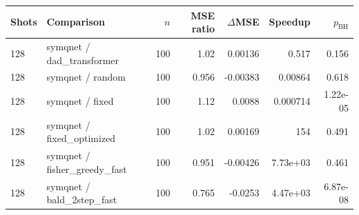 \begin{tabular}{llrrrrr}
\toprule
Shots & Comparison & $n$ & MSE ratio & $\Delta$MSE & Speedup & $p_{\mathrm{BH}}$ \\
\midrule
128 & symqnet / dad\_transformer & 100 & 1.02 & 0.00136 & 0.517 & 0.156 \\
128 & symqnet / random & 100 & 0.956 & -0.00383 & 0.00864 & 0.618 \\
128 & symqnet / fixed & 100 & 1.12 & 0.0088 & 0.000714 & 1.22e-05 \\
128 & symqnet / fixed\_optimized & 100 & 1.02 & 0.00169 & 154 & 0.491 \\
128 & symqnet / fisher\_greedy\_fast & 100 & 0.951 & -0.00426 & 7.73e+03 & 0.461 \\
128 & symqnet / bald\_2step\_fast & 100 & 0.765 & -0.0253 & 4.47e+03 & 6.87e-08 \\
\bottomrule
\end{tabular}
